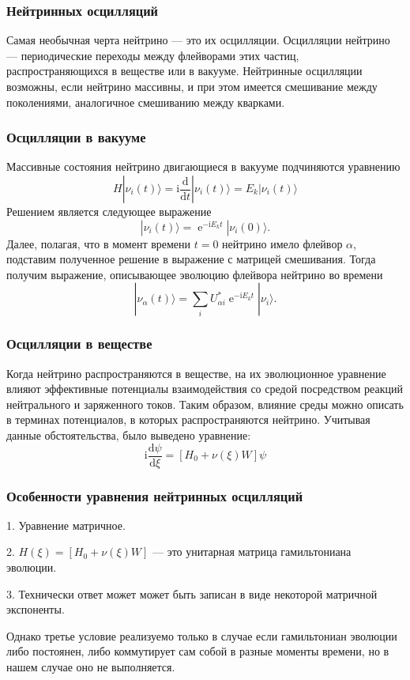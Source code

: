 \documentclass[utf8,9pt,mathserif,usepdftitle=false]{beamer}
\newcommand{\dd}{\mathrm{d}}
\renewcommand{\exp}{\operatorname{e}}
\renewcommand{\imath}{\mathrm{i}}
\begin{document}
\begin{frame}
	\frametitle{Нейтринных осцилляций}%
	Самая необычная черта нейтрино — это их осцилляции. Осцилляции нейтрино —
	периодические переходы между флейворами этих частиц, распространяющихся в
	веществе или в вакууме. Нейтринные осцилляции возможны, если нейтрино массивны, и при этом имеется смешивание между поколениями, аналогичное смешиванию между кварками.
	\end{frame}
	\begin{frame}
		\frametitle{Осцилляции в вакууме}
	Массивные состояния нейтрино двигающиеся в вакууме подчиняются уравнению
	\begin{equation}
		H|\nu_{i}(t)\rangle=\imath\frac{\dd}{\dd t}|\nu_{i}(t)\rangle=
		E_{k}|\nu_{i}(t)\rangle 
	\end{equation}
	Решением является следующее выражение 
	\begin{equation}
		|\nu_{i}(t)\rangle=\exp^{-\imath E_{k}t}|\nu_{i}(0)\rangle.
	\end{equation}
	Далее, полагая, что в момент времени \(t=0\) нейтрино имело флейвор \(\alpha\), подставим полученное решение в выражение с матрицей смешивания. Тогда получим выражение, описывающее эволюцию флейвора нейтрино во времени
	\begin{equation}
		|\nu_{\alpha}(t)\rangle=\sum_{i}U_{\alpha i}^{*}\exp^{-\imath E_{k}t}|\nu_{i}\rangle. 
	\end{equation}
\end{frame}
\begin{frame}
	\frametitle{Осцилляции в веществе}
	Когда нейтрино распространяются в веществе, на их
  эволюционное уравнение влияют эффективные потенциалы взаимодействия со средой посредством реакций нейтрального и заряженного токов. Таким образом, влияние среды можно описать в терминах потенциалов, в
  которых распространяются нейтрино. Учитывая данные обстоятельства, было выведено уравнение:
	\begin{equation}\label{eq:2}
		\imath\frac{\dd\psi}{\dd\xi}=[H_{0}+\nu(\xi)W]\psi
	\end{equation}
\end{frame}

\begin{frame}
	\frametitle{Особенности уравнения нейтринных осцилляций}
		1. Уравнение матричное.
		
		2. \(H(\xi)=[H_{0}+\nu(\xi)W]\) --- это унитарная матрица гамильтониана эволюции.
		
		3. Технически ответ может может быть записан в виде некоторой матричной экспоненты.
	
	Однако третье условие реализуемо только в случае если гамильтониан эволюции либо постоянен, либо коммутирует сам собой в разные моменты времени, но в нашем случае оно не выполняется.
\end{frame}
\end{document}
